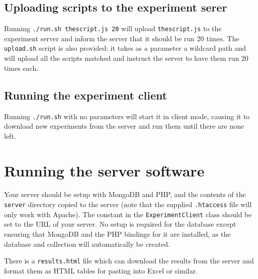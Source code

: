 \subsection{Uploading scripts to the experiment serer}

Running {\tt ./run.sh thescript.js 20} will upload {\tt thescript.js} to the experiment server and inform the server that it should be run 20 times.  The {\tt upload.sh} script is also provided: it takes as a parameter a wildcard path and will upload all the scripts matched and instruct the server to have them run 20 times each.

\subsection{Running the experiment client}

Running {\tt ./run.sh} with no parameters will start it in client mode, causing it to download new experiments from the server and run them until there are none left.


\section{Running the server software}

Your server should be setup with MongoDB and PHP, and the contents of the {\tt server} directory copied to the server (note that the supplied {\tt .htaccess} file will only work with Apache).  The constant in the {\tt ExperimentClient} class should be set to the URL of your server.  No setup is required for the database except ensuring that MongoDB and the PHP bindings for it are installed, as the database and collection will automatically be created.

There is a {\tt results.html} file which can download the results from the server and format them as HTML tables for pasting into Excel or similar.

